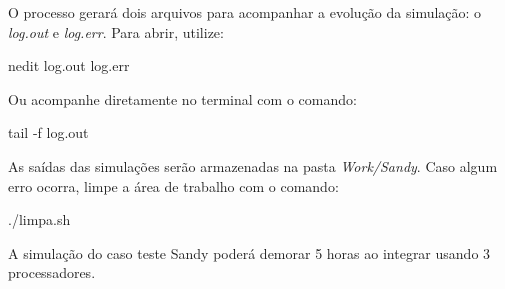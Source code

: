 \noindent O processo gerará dois arquivos para acompanhar a evolução da simulação: o \textit{log.out} e \textit{log.err}. Para abrir, utilize:
\bigskip

\begin{bashcode}
nedit log.out log.err
\end{bashcode}
\bigskip

\noindent Ou acompanhe diretamente no terminal com o comando:
\bigskip

\begin{bashcode}
tail -f log.out
\end{bashcode}
\bigskip

\noindent As saídas das simulações serão armazenadas na pasta \textit{Work/Sandy}. Caso algum erro ocorra, limpe a área de trabalho com o comando:
\bigskip

\begin{bashcode}
./limpa.sh
\end{bashcode}
\bigskip


\begin{tcolorbox}[enhanced,
  grow to left by=0cm,%
  grow to right by=0cm,%
  enlarge top by=0cm,%
  enlarge bottom by=0cm,%
  tcbox raise base,
  boxrule=1.0pt,
  left=18mm,
  colframe=red!50!black,coltext=red!25!black,colback=red!10!white,
  overlay={\begin{tcbclipinterior}\fill[red!75!blue!50!white] (frame.south west)
    rectangle node[text=white,font=\sffamily\bfseries\footnotesize,rotate=0] {ATENÇÃO} ([xshift=18mm]frame.north west);\end{tcbclipinterior}}]
A simulação do caso teste Sandy poderá demorar 5 horas ao integrar usando 3 processadores.
\end{tcolorbox}
\bigskip
